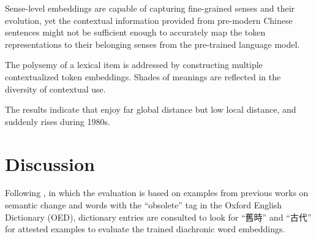\begin{exe}
\end{exe}

Sense-level embeddings are capable of capturing fine-grained senses and their evolution, yet the contextual information provided from pre-modern Chinese sentences might not be sufficient enough to accurately map the token representations to their belonging senses from the pre-trained language model.


The polysemy of a lexical item is addressed by constructing multiple contextualized token embeddings. Shades of meanings are reflected in the diversity of contextual use.

The results indicate that \jia enjoy far global distance but low local distance, and suddenly rises during 1980s.






\section{Discussion}

Following \textcite{hamilton2016law}, in which the evaluation is based on examples from previous works on semantic change and words with the ``obsolete'' tag in the Oxford English Dictionary (OED), dictionary entries are consulted to look for ``舊時'' and ``古代'' for attested examples to evaluate the trained diachronic word embeddings.

